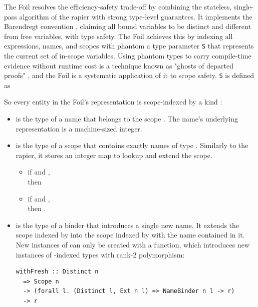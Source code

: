 The Foil \cite{foil2023} resolves the efficiency-safety trade-off by combining the stateless, single-pass algorithm of the rapier with strong type-level guarantees. 
It implements the Barendregt convention \cite{Barendregt}, claiming all bound variables to be distinct and different from free variables, with type safety.
The Foil achieves this by indexing all expressions, names, and scopes with phantom a type parameter \texttt{S} that represents the current set of in-scope variables. 
Using phantom types to carry compile-time evidence without runtime cost is a technique known as "ghosts of departed proofs" \cite{ghostsOfDepartedProofs2018}, and the Foil is a systematic application of it to scope safety.
\texttt{S} is defined as 

So every entity in the Foil's representation is scope-indexed by a kind :

\begin{itemize}
    \item {} is the type of a name that belongs to the scope . The name's underlying representation is a machine-sized integer.

    \item {} is the type of a scope that contains exactly names of type .
    Similarly to the rapier, it stores an integer map \cite{OkasakiGill1998} to lookup and extend the scope.
    \begin{itemize}
        \item if  and ,\\
        then 
        \item if  and ,\\
        then .
    \end{itemize}

    \item {} is the type of a binder that introduces a single new name. It extends the scope indexed by  into the scope indexed by  with the name contained in it.
    New instances of  can only be created with a  function, which introduces new instances of -indexed types with rank-2 polymorphism:
    \begin{verbatim}
withFresh :: Distinct n 
  => Scope n
  -> (forall l. (Distinct l, Ext n l) => NameBinder n l -> r) 
  -> r
    \end{verbatim}
\end{itemize}

